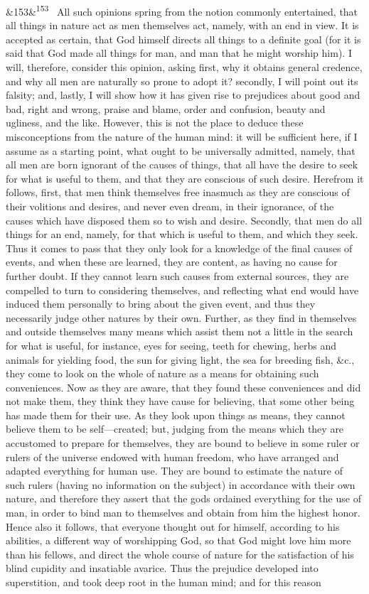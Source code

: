 \documentclass[12pt]{article}
\newcommand{\para}[1][]{\par\noindent\ifx&#1&\else\textsuperscript{\footnotesize #1}~\fi}
\begin{document}
\para[153] All such opinions spring from the notion commonly entertained, that all things in nature act as men themselves act, namely, with an end in view. It is accepted as certain, that God himself directs all things to a definite goal (for it is said that God made all things for man, and man that he might worship him). I will, therefore, consider this opinion, asking first, why it obtains general credence, and why all men are naturally so prone to adopt it? secondly, I will point out its falsity; and, lastly, I will show how it has given rise to prejudices about good and bad, right and wrong, praise and blame, order and confusion, beauty and ugliness, and the like. However, this is not the place to deduce these misconceptions from the nature of the human mind: it will be sufficient here, if I assume as a starting point, what ought to be universally admitted, namely, that all men are born ignorant of the causes of things, that all have the desire to seek for what is useful to them, and that they are conscious of such desire. Herefrom it follows, first, that men think themselves free inasmuch as they are conscious of their volitions and desires, and never even dream, in their ignorance, of the causes which have disposed them so to wish and desire. Secondly, that men do all things for an end, namely, for that which is useful to them, and which they seek. Thus it comes to pass that they only look for a knowledge of the final causes of events, and when these are learned, they are content, as having no cause for further doubt. If they cannot learn such causes from external sources, they are compelled to turn to considering themselves, and reflecting what end would have induced them personally to bring about the given event, and thus they necessarily judge other natures by their own. Further, as they find in themselves and outside themselves many means which assist them not a little in the search for what is useful, for instance, eyes for seeing, teeth for chewing, herbs and animals for yielding food, the sun for giving light, the sea for breeding fish, \&c., they come to look on the whole of nature as a means for obtaining such conveniences. Now as they are aware, that they found these conveniences and did not make them, they think they have cause for believing, that some other being has made them for their use. As they look upon things as means, they cannot believe them to be self---created; but, judging from the means which they are accustomed to prepare for themselves, they are bound to believe in some ruler or rulers of the universe endowed with human freedom, who have arranged and adapted everything for human use. They are bound to estimate the nature of such rulers (having no information on the subject) in accordance with their own nature, and therefore they assert that the gods ordained everything for the use of man, in order to bind man to themselves and obtain from him the highest honor. Hence also it follows, that everyone thought out for himself, according to his abilities, a different way of worshipping God, so that God might love him more than his fellows, and direct the whole course of nature for the satisfaction of his blind cupidity and insatiable avarice. Thus the prejudice developed into superstition, and took deep root in the human mind; and for this reason 
\end{document}
